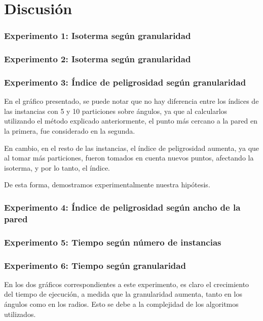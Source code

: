 \section{Discusión}

  	\subsubsection*{Experimento 1: Isoterma según granularidad}

  	\subsubsection*{Experimento 2: Isoterma según granularidad}

  	\subsubsection*{Experimento 3: Índice de peligrosidad según granularidad}
  		En el gráfico presentado, se puede notar que no hay diferencia entre los índices de las instancias con 5 y 10 particiones sobre ángulos, ya que al calcularlos utilizando el método explicado anteriormente, el punto más cercano a la pared en la primera, fue considerado en la segunda. 

  		En cambio, en el resto de las instancias, el índice de peligrosidad aumenta, ya que al tomar más particiones, fueron tomados en cuenta nuevos puntos, afectando la isoterma, y por lo tanto, el índice. 

  		De esta forma, demostramos experimentalmente nuestra hipótesis. 

  	\subsubsection*{Experimento 4: Índice de peligrosidad según ancho de la pared}

  	\subsubsection*{Experimento 5: Tiempo según número de instancias}

  	\subsubsection*{Experimento 6: Tiempo según granularidad}
  		En los dos gráficos correspondientes a este experimento, es claro el crecimiento del tiempo de ejecución, a medida que la granularidad aumenta, tanto en los ángulos como en los radios. Esto se debe a la complejidad de los algoritmos utilizados.

